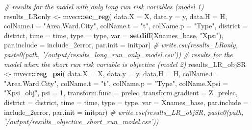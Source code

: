 \documentclass[
]{article}
\newenvironment{Shaded}{\begin{snugshade}}{\end{snugshade}}
\newcommand{\CommentTok}[1]{\textcolor[rgb]{0.56,0.35,0.01}{\textit{#1}}}
\newcommand{\DataTypeTok}[1]{\textcolor[rgb]{0.13,0.29,0.53}{#1}}
\newcommand{\DecValTok}[1]{\textcolor[rgb]{0.00,0.00,0.81}{#1}}
\newcommand{\KeywordTok}[1]{\textcolor[rgb]{0.13,0.29,0.53}{\textbf{#1}}}
\newcommand{\NormalTok}[1]{#1}
\newcommand{\OperatorTok}[1]{\textcolor[rgb]{0.81,0.36,0.00}{\textbf{#1}}}
\newcommand{\StringTok}[1]{\textcolor[rgb]{0.31,0.60,0.02}{#1}}
\begin{document}
\begin{Shaded}
\begin{Highlighting}[]
\CommentTok{# results for the model with only long run risk variables (model 1)}
\NormalTok{results_LRonly <-}\StringTok{ }\NormalTok{mvecr}\OperatorTok{::}\KeywordTok{ec_reg}\NormalTok{(}
  \DataTypeTok{data.X =}\NormalTok{ X, }\DataTypeTok{data.y =}\NormalTok{ y, }\DataTypeTok{data.H =}\NormalTok{ H,}
  \DataTypeTok{colName.i =} \StringTok{"Area.Ward.City"}\NormalTok{, }\DataTypeTok{colName.t =} \StringTok{"t"}\NormalTok{, }
  \DataTypeTok{colName.p =} \StringTok{"Type"}\NormalTok{, }
  \DataTypeTok{district =}\NormalTok{ district, }\DataTypeTok{time =}\NormalTok{ time, }\DataTypeTok{type =}\NormalTok{ type,}
  \DataTypeTok{var =} \KeywordTok{setdiff}\NormalTok{(Xnames_base, }\StringTok{"Xpsi"}\NormalTok{),}
  \DataTypeTok{par.include =}\NormalTok{ include_2error,}
  \DataTypeTok{par.init =}\NormalTok{ initpar)}
\CommentTok{# write.csv(results_LRonly, paste0(path, '/output/results_long_run_only_model.csv'))}
\CommentTok{# results for the model when the short run risk variable is objective (model 2)}
\NormalTok{results_LR_objSR <-}\StringTok{ }\NormalTok{mvecr}\OperatorTok{::}\KeywordTok{reg_psi}\NormalTok{(}
  \DataTypeTok{data.X =}\NormalTok{ X, }\DataTypeTok{data.y =}\NormalTok{ y, }\DataTypeTok{data.H =}\NormalTok{ H,}
  \DataTypeTok{colName.i =} \StringTok{"Area.Ward.City"}\NormalTok{, }\DataTypeTok{colName.t =} \StringTok{"t"}\NormalTok{, }
  \DataTypeTok{colName.p =} \StringTok{"Type"}\NormalTok{, }\DataTypeTok{colName.Xpsi =} \StringTok{"Xpsi_obj"}\NormalTok{,}
  \DataTypeTok{psi =} \DecValTok{1}\NormalTok{, }
  \DataTypeTok{transform.func =}\NormalTok{ prelec, }\DataTypeTok{transform.gradient =}\NormalTok{ Z_prelec,}
  \DataTypeTok{district =}\NormalTok{ district, }\DataTypeTok{time =}\NormalTok{ time, }\DataTypeTok{type =}\NormalTok{ type,}
  \DataTypeTok{var =}\NormalTok{ Xnames_base,}
  \DataTypeTok{par.include =}\NormalTok{ include_2error,}
  \DataTypeTok{par.init =}\NormalTok{ initpar)}
\CommentTok{# write.csv(results_LR_objSR, paste0(path, '/output/results_objective_short_run_model.csv'))}


\end{Highlighting}
\end{Shaded}
\end{document}
